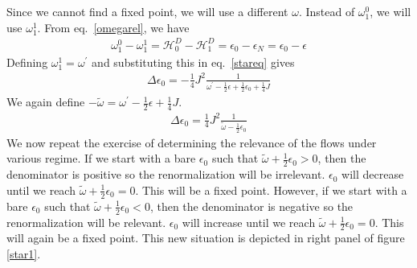 Since we cannot find a fixed point, we will use a different \(\omega\). Instead of \(\omega_1^0\), we will use \(\omega_1^1\). From eq.~\ref{omegarel}, we have 
\begin{equation}\begin{aligned}
	\omega_1^0  - \omega_1^1 = \mathcal{H}^D_0 - \mathcal{H}^D_1 = \epsilon_0 - \epsilon_N = \epsilon_0 - \epsilon
\end{aligned}\end{equation}
Defining \(\omega_1^1 = \omega^\prime\) and substituting this in eq.~\ref{stareq} gives
\begin{equation}\begin{aligned}
	\Delta \epsilon_0 = -\frac{1}{4}J^2 \frac{1}{\omega^\prime - \frac{1}{2}\epsilon + \frac{1}{2}\epsilon_0 + \frac{1}{4}J}
\end{aligned}\end{equation}
We again define \(-\tilde \omega = \omega^\prime - \frac{1}{2}\epsilon + \frac{1}{4}J\).
\begin{equation}\begin{aligned}
	\Delta \epsilon_0 = \frac{1}{4}J^2 \frac{1}{\tilde \omega - \frac{1}{2}\epsilon_0}
\end{aligned}\end{equation}
We now repeat the exercise of determining the relevance of the flows under various regime. If we start with a bare \(\epsilon_0\) such that \(\tilde \omega + \frac{1}{2}\epsilon_0 > 0\), then the denominator is positive so the renormalization will be irrelevant. \(\epsilon_0\) will decrease until we reach \(\tilde \omega + \frac{1}{2}\epsilon_0 = 0\). This will be a fixed point. However, if we start with a bare \(\epsilon_0\) such that \(\tilde \omega + \frac{1}{2}\epsilon_0 < 0\), then the denominator is negative so the renormalization will be relevant. \(\epsilon_0\) will increase until we reach \(\tilde \omega + \frac{1}{2}\epsilon_0 = 0\). This will again be a fixed point. This new situation is depicted in right panel of figure \ref{star1}.
